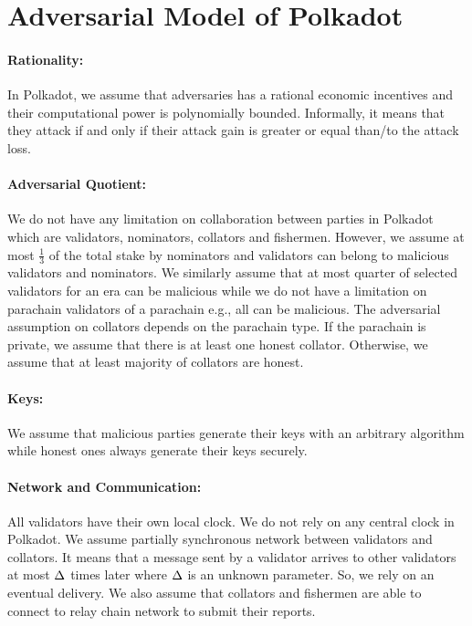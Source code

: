 \section{Adversarial Model of Polkadot}

\paragraph{Rationality:} In Polkadot, we assume that adversaries has a rational economic incentives and their computational power is  polynomially bounded. Informally, it means that they attack if and only if their attack gain is greater or equal than/to the attack loss. 

\paragraph{Adversarial Quotient:} We do not have any limitation on collaboration between parties in Polkadot which are validators, nominators, collators and fishermen. However, we assume at most $\frac{1}{3}$ of the  total stake by nominators and validators can belong to malicious validators and nominators. 
We similarly assume that at most quarter of selected validators for an era can be malicious while we do not have a limitation on parachain validators of a parachain e.g., all can be malicious.  
The adversarial assumption on collators depends on the parachain type. If the parachain is private, we assume that there is at least one honest collator. Otherwise, we assume that at least majority of collators are honest.

\paragraph{Keys:} We assume that  malicious parties generate their keys with an arbitrary algorithm while  honest ones always generate their keys securely.

\paragraph{Network and Communication:} All validators have their own local clock. We do not rely on any central clock in Polkadot. We assume partially synchronous network between validators and collators. It means that a message sent by a validator arrives to other validators at most $\Delta$ times later where $\Delta$ is an unknown parameter. So, we rely on an eventual delivery.
We also assume that collators and fishermen are able to connect to relay chain network to submit their reports.
